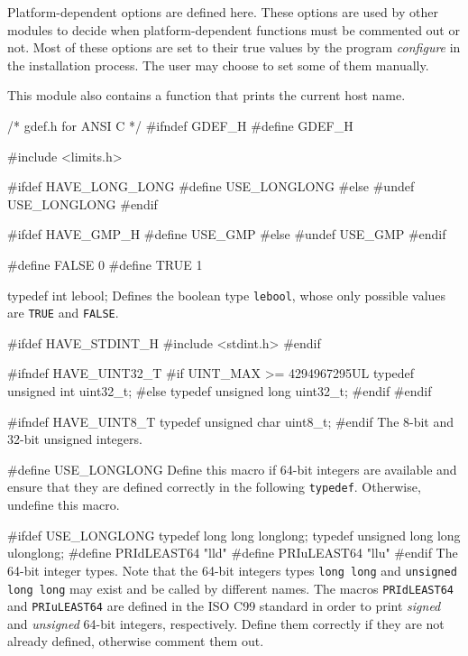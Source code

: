 
Platform-dependent options are defined here.
These options are used by other modules to decide when 
platform-dependent functions must be commented out or not.
Most of these options are set to their true values by the program
{\it configure} in the installation process. The user may choose
to set some of them manually.
\iffalse
Each option must either be left undefined (i.e., the corresponding
macro is put to false, using ``\texttt{\#undef}) 
or can be given its proper value (using ``\texttt{\#define} commands).
An option can be defined only under certain conditions.
For example, \texttt{USE\_GMP} can be defined only if GMP
is available, \texttt{HAVE\_ERF} can be defined only if the Unix \texttt{erf}
function is available, and so on.
\fi
This module also contains a function that prints the current host name.

\code\hide
/* gdef.h  for ANSI C */
#ifndef GDEF_H
#define GDEF_H

#include <limits.h>

#ifdef HAVE_LONG_LONG
#define USE_LONGLONG
#else
#undef USE_LONGLONG
#endif

#ifdef HAVE_GMP_H
#define USE_GMP
#else
#undef USE_GMP
#endif
\endhide
\endcode


\code
#define FALSE 0
#define TRUE 1

typedef int  lebool;
\endcode
  \tab Defines the boolean type \texttt{lebool}, whose only possible values are
  {\tt TRUE} and {\tt FALSE}.
 \endtab
\code


#ifdef HAVE_STDINT_H
#include <stdint.h>
#endif

#ifndef HAVE_UINT32_T
#if UINT_MAX >= 4294967295UL
   typedef unsigned int  uint32_t;
#else
   typedef unsigned long  uint32_t;
#endif
#endif

#ifndef HAVE_UINT8_T
   typedef unsigned char  uint8_t;
#endif
\endcode
  \tab The 8-bit and 32-bit unsigned integers.
 \endtab
\code


#define USE_LONGLONG
\endcode
  \tab  Define this macro if 64-bit integers are available and ensure that
  they are defined correctly in the following \texttt{typedef}. Otherwise,
  undefine this macro.
 \endtab
\code


#ifdef USE_LONGLONG
   typedef long long  longlong;
   typedef unsigned long long  ulonglong;
#define PRIdLEAST64  "lld"
#define PRIuLEAST64  "llu"
#endif
\endcode
  \tab  The 64-bit integer types. Note that the 64-bit integers types
  \texttt{long long} and \texttt{unsigned long long} may exist and be called 
  by different names.
  The macros \texttt{PRIdLEAST64} and \texttt{PRIuLEAST64} are defined 
  in the ISO C99 standard in order to print \emph{signed} 
  and \emph{unsigned}  64-bit integers, respectively.
   Define them correctly if they are not already defined, otherwise 
  comment them out.
 \endtab
\hide
\code


